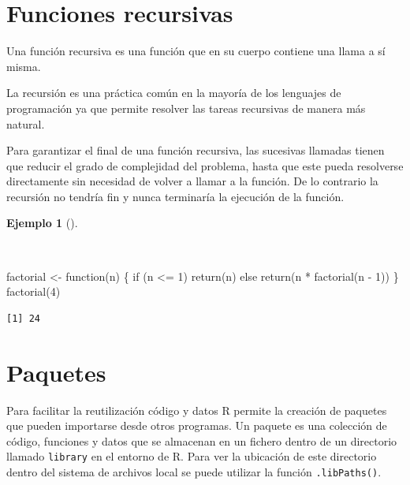 \documentclass[
  a4paper,
]{scrreport}
\newenvironment{Shaded}{\begin{snugshade}}{\end{snugshade}}
\newcommand{\ControlFlowTok}[1]{\textcolor[rgb]{0.00,0.23,0.31}{#1}}
\newcommand{\DecValTok}[1]{\textcolor[rgb]{0.68,0.00,0.00}{#1}}
\newcommand{\FunctionTok}[1]{\textcolor[rgb]{0.28,0.35,0.67}{#1}}
\newcommand{\NormalTok}[1]{\textcolor[rgb]{0.00,0.23,0.31}{#1}}
\newcommand{\OtherTok}[1]{\textcolor[rgb]{0.00,0.23,0.31}{#1}}
\newcommand{\SpecialCharTok}[1]{\textcolor[rgb]{0.37,0.37,0.37}{#1}}
\theoremstyle{definition}
\theoremstyle{definition}
\newtheorem{example}{Ejemplo}[chapter]
\theoremstyle{remark}
\begin{document}
\hypertarget{funciones-recursivas}{%
\section{Funciones recursivas}\label{funciones-recursivas}}

Una función recursiva es una función que en su cuerpo contiene una llama
a sí misma.

La recursión es una práctica común en la mayoría de los lenguajes de
programación ya que permite resolver las tareas recursivas de manera más
natural.

Para garantizar el final de una función recursiva, las sucesivas
llamadas tienen que reducir el grado de complejidad del problema, hasta
que este pueda resolverse directamente sin necesidad de volver a llamar
a la función. De lo contrario la recursión no tendría fin y nunca
terminaría la ejecución de la función.

\begin{example}[]\protect\hypertarget{exm-funcion-recursiva}{}\label{exm-funcion-recursiva}

~

\begin{Shaded}
\begin{Highlighting}[]
\NormalTok{factorial }\OtherTok{\textless{}{-}} \ControlFlowTok{function}\NormalTok{(n) \{}
  \ControlFlowTok{if}\NormalTok{ (n }\SpecialCharTok{\textless{}=} \DecValTok{1}\NormalTok{) }\FunctionTok{return}\NormalTok{(n)}
  \ControlFlowTok{else} \FunctionTok{return}\NormalTok{(n }\SpecialCharTok{*} \FunctionTok{factorial}\NormalTok{(n }\SpecialCharTok{{-}} \DecValTok{1}\NormalTok{))}
\NormalTok{\}}
\FunctionTok{factorial}\NormalTok{(}\DecValTok{4}\NormalTok{)}
\end{Highlighting}
\end{Shaded}

\begin{verbatim}
[1] 24
\end{verbatim}

\end{example}

\hypertarget{paquetes}{%
\section{Paquetes}\label{paquetes}}

Para facilitar la reutilización código y datos R permite la creación de
paquetes que pueden importarse desde otros programas. Un paquete es una
colección de código, funciones y datos que se almacenan en un fichero
dentro de un directorio llamado \texttt{library} en el entorno de R.
Para ver la ubicación de este directorio dentro del sistema de archivos
local se puede utilizar la función \texttt{.libPaths()}.
\end{document}
